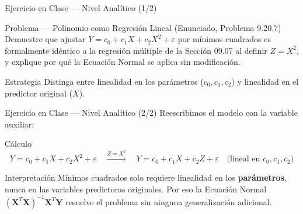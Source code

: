 \documentclass[10pt, aspectratio=169]{beamer}
\begin{document}




\begin{frame}{Ejercicio en Clase --- Nivel Analítico (1/2)}
  \footnotesize
  \begin{block}{Problema --- Polinomio como Regresión Lineal (Enunciado, Problema 9.20.7)}
    Demuestre que ajustar $Y=c_0+c_1X+c_2X^2+\varepsilon$ por mínimos cuadrados es formalmente idéntico a la regresión múltiple de la Sección 09.07 al definir $Z=X^2$, y explique por qué la Ecuación Normal se aplica sin modificación.
  \end{block}

  \vspace{0.1cm}
  \pause
  \begin{alertblock}{Estrategia}
    Distinga entre linealidad en los parámetros ($c_0,c_1,c_2$) y linealidad en el predictor original ($X$).
  \end{alertblock}
\end{frame}

\begin{frame}{Ejercicio en Clase --- Nivel Analítico (2/2)}
  \scriptsize
  Reescribimos el modelo con la variable auxiliar: \pause

  \vspace{0.05cm}
  \begin{block}{Cálculo}
    \scriptsize
    $$Y=c_0+c_1X+c_2X^2+\varepsilon \quad \xrightarrow{Z=X^2} \quad Y=c_0+c_1X+c_2Z+\varepsilon \quad \text{(lineal en } c_0,c_1,c_2\text{)}$$
  \end{block}

  \vspace{0.05cm}
  \pause
  \begin{alertblock}{Interpretación}
    Mínimos cuadrados solo requiere linealidad en los \textbf{parámetros}, nunca en las variables predictoras originales. Por eso la Ecuación Normal $(\mathbf{X}^T\mathbf{X})^{-1}\mathbf{X}^T\mathbf{Y}$ resuelve el problema sin ninguna generalización adicional.
  \end{alertblock}
\end{frame}
\end{document}
